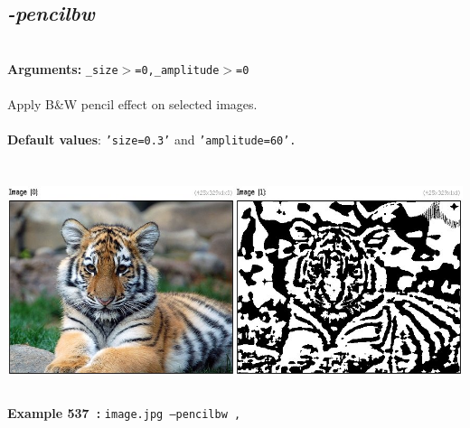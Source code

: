 \documentclass[a4paper,11pt,twoside]{book}
\begin{document}
\subsection{\emph{-pencilbw} }\vspace*{-0.5em}
~\\\textbf{Arguments: } 
{\small \texttt{\_size$>$=0,\_amplitude$>$=0}}\\~\\
Apply B\&W pencil effect on selected images.
~\\~\\\textbf{Default values}: {\small \texttt{'size=0.3'} and \texttt{'amplitude=60'.}}
\begin{center}\includegraphics[keepaspectratio=true,height=7cm,width=\textwidth]{img/gmic_def537.jpg}\\
{\footnotesize \textbf{Example 537~:} \texttt{image.jpg --pencilbw ,}}
\end{center}
\end{document}
